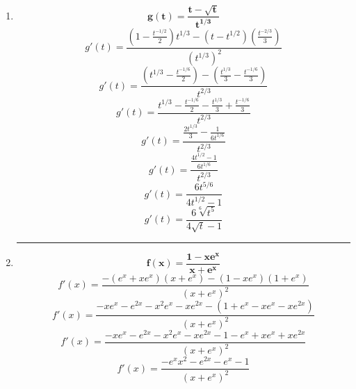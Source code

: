 \documentclass[12pt]{article}
\begin{document}
\begin{enumerate}[label=\textbf{\arabic*)}]
            \hrule\item \[\bm{g(t) = \frac{t - \sqrt{t}}{t^{1/3}}}\]
                \[g'(t) = \frac{\left(1 - \frac{t^{-1/2}}{2}\right) t^{1/3} - (t - t^{1/2}) \left(\frac{t^{-2/3}}{3}\right)}{(t^{1/3})^2}\]
                \[g'(t) = \frac{\left(t^{1/3} - \frac{t^{-1/6}}{2}\right) - \left(\frac{t^{1/3}}{3} - \frac{t^{-1/6}}{3}\right)}{t^{2/3}}\]  
                \[g'(t) = \frac{t^{1/3} - \frac{t^{-1/6}}{2} - \frac{t^{1/3}}{3} + \frac{t^{-1/6}}{3}}{t^{2/3}}\] 
                \[g'(t) = \frac{\frac{2t^{1/3}}{3} - \frac{1}{6t^{1/6}}}{t^{2/3}}\] 
                \[g'(t) = \frac{\frac{4t^{1/2} - 1}{6t^{1/6}}}{t^{2/3}}\] 
                \[g'(t) = \frac{6t^{5/6}}{4t^{1/2} - 1}\] 
                \[g'(t) = \frac{6\sqrt[6]{t^5}}{4\sqrt{t} - 1}\] 

            \hrule\item \[\bm{f(x) = \frac{1 - xe^x}{x + e^x}}\]
                \[f'(x) = \frac{-(e^x +xe^x)(x + e^x) - (1 - xe^x)(1 + e^x)}{(x + e^x)^2}\] 
                \[f'(x) = \frac{-xe^x - e^{2x} - x^2 e^x - xe^{2x} - (1 + e^x - xe^x - xe^{2x})}{(x + e^x)^2}\] 
                \[f'(x) = \frac{-xe^x - e^{2x} - x^2 e^x - xe^{2x} - 1 - e^x + xe^x + xe^{2x}}{(x + e^x)^2}\] 
                \[f'(x) = \frac{-e^x x^2 - e^{2x} - e^x - 1}{(x + e^x)^2}\] 
        \end{enumerate}


    \newpage
\end{document}
